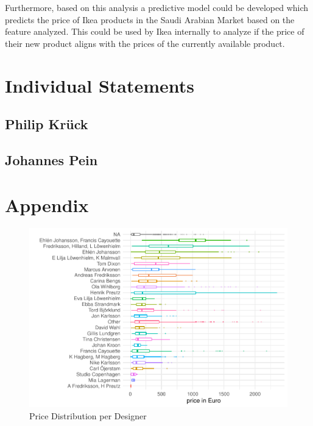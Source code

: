 \documentclass[a4paper, nobind]{templates/ociamthesis}
\begin{document}
Furthermore, based on this analysis a predictive model could be developed which predicts the price of Ikea products in the Saudi Arabian Market based on the feature analyzed. This could be used by Ikea internally to analyze if the price of their new product aligns with the prices of the currently available product.

\hypertarget{individual-statements}{%
\chapter{Individual Statements}\label{individual-statements}}

\hypertarget{philip-kruxfcck}{%
\section{Philip Krück}\label{philip-kruxfcck}}

\hypertarget{johannes-pein}{%
\section{Johannes Pein}\label{johannes-pein}}

\startappendices

\hypertarget{appendix}{%
\chapter{Appendix}\label{appendix}}

\begin{figure}[!h]
\includegraphics[width=1\linewidth]{_main_files/figure-latex/price-dist-per-designer-1} \caption{Price Distribution per Designer}\label{fig:price-dist-per-designer}
\end{figure}
\end{document}
